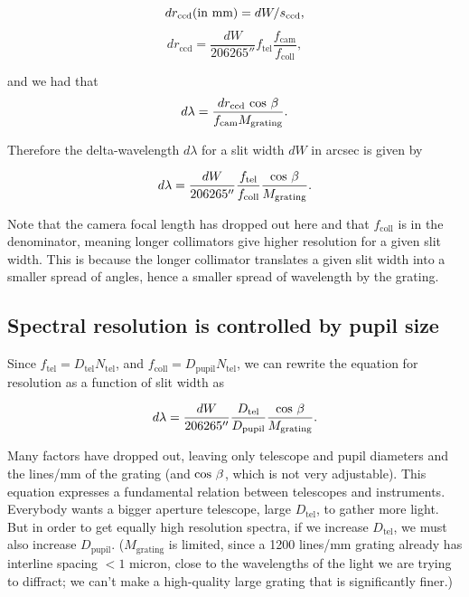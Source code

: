 \documentclass[12pt]{article}
\begin{document}
$$ dr_{\mathrm{ccd}} {\rm (in\ mm)} = dW / s_{\mathrm{ccd}} , $$
$$ dr_{\mathrm{ccd}} = \frac{dW}{206265''} f_{\mathrm{tel}} \frac{f_{\mathrm{cam}}}{f_{\mathrm{coll}}}, $$

and we had that
$$ d\lambda = \frac{dr_{\mathrm{ccd}}~{\rm cos}~\beta}{f_{\mathrm{cam}} M_{\mathrm{grating}}}. $$

Therefore the delta-wavelength $d\lambda$ for a slit width $dW$
in arcsec is given by

%

$$  d\lambda = \frac{dW}{206265''} \frac{f_{\mathrm{tel}}}{f_{\mathrm{coll}}}\frac{{\rm cos}~\beta}{M_{\mathrm{grating}}}. $$

Note that the camera focal length has dropped out here and
that $f_{\mathrm{coll}}$ is in the denominator, meaning longer collimators
give higher resolution for a given slit width.  This is 
because the longer collimator translates a given slit width
into a smaller spread of angles, hence a smaller spread of
wavelength by the grating.

\subsection{Spectral resolution is controlled by pupil size}

Since $f_{\mathrm{tel}} = D_{\mathrm{tel}} N_{\mathrm{tel}}$, and $f_{\mathrm{coll}} = D_{\mathrm{pupil}}  N_{\mathrm{tel}}$,
we can rewrite the equation for resolution as a function of 
slit width as

$$ d\lambda = \frac{dW}{206265''}  \frac{D_{\mathrm{tel}}}{D_{\mathrm{pupil}}} \frac{{\rm cos}~\beta}{M_{\mathrm{grating}}}. $$

Many factors have dropped out, leaving only telescope and
pupil diameters and the lines/mm of the grating (and ${\rm cos}~\beta$,
which is not very adjustable).
This equation expresses a fundamental relation between telescopes
and instruments.
Everybody wants a bigger aperture telescope, large $D_{\mathrm{tel}}$, to
gather more light.  But in order to get equally
high resolution spectra, if we increase $D_{\mathrm{tel}}$,
we must also increase $D_{\mathrm{pupil}}$.  ($M_{\mathrm{grating}}$ is limited, since a 
1200 lines/mm grating already has interline spacing $<1$ micron,
close to the wavelengths of the light we are trying to diffract;
we can't make a high-quality large grating that is significantly finer.)
\end{document}
